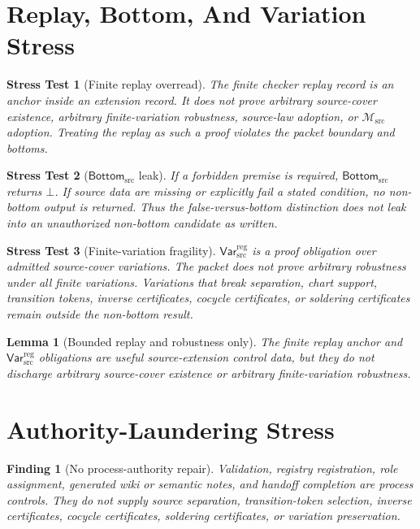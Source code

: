 \documentclass[11pt]{article}
\newcommand{\Msrc}{\mathcal{M}_{\mathrm{src}}}
\newcommand{\BottomSrc}{\mathsf{Bottom}_{\mathrm{src}}}
\newcommand{\VarRegSrc}{\mathsf{Var}^{\mathrm{reg}}_{\mathrm{src}}}
\newcommand{\Bot}{\bot}
\newtheorem{stress}{Stress Test}
\newtheorem{lemma}{Lemma}
\newtheorem{finding}{Finding}
\begin{document}
\section{Replay, Bottom, And Variation Stress}

\begin{stress}[Finite replay overread]
The finite checker replay record is an anchor inside an extension record. It
does not prove arbitrary source-cover existence, arbitrary finite-variation
robustness, source-law adoption, or \(\Msrc\) adoption. Treating the replay
as such a proof violates the packet boundary and bottoms.
\end{stress}

\begin{stress}[\(\BottomSrc\) leak]
If a forbidden premise is required, \(\BottomSrc\) returns \(\Bot\). If source
data are missing or explicitly fail a stated condition, no non-bottom output
is returned. Thus the false-versus-bottom distinction does not leak into an
unauthorized non-bottom candidate as written.
\end{stress}

\begin{stress}[Finite-variation fragility]
\(\VarRegSrc\) is a proof obligation over admitted source-cover variations.
The packet does not prove arbitrary robustness under all finite variations.
Variations that break separation, chart support, transition tokens, inverse
certificates, cocycle certificates, or soldering certificates remain outside
the non-bottom result.
\end{stress}

\begin{lemma}[Bounded replay and robustness only]
The finite replay anchor and \(\VarRegSrc\) obligations are useful
source-extension control data, but they do not discharge arbitrary
source-cover existence or arbitrary finite-variation robustness.
\end{lemma}

\section{Authority-Laundering Stress}

\begin{finding}[No process-authority repair]
Validation, registry registration, role assignment, generated wiki or
semantic notes, and handoff completion are process controls. They do not
supply source separation, transition-token selection, inverse certificates,
cocycle certificates, soldering certificates, or variation preservation.
\end{finding}
\end{document}
